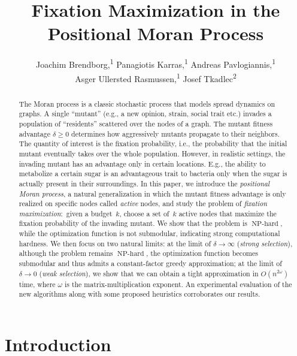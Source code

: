 \documentclass[letterpaper]{article}
\title{Fixation Maximization in the Positional Moran Process}
\author{
Joachim Brendborg,\textsuperscript{\rm 1}
Panagiotis Karras,\textsuperscript{\rm 1}
Andreas Pavlogiannis,\textsuperscript{\rm 1}\\
Asger Ullersted Rasmussen,\textsuperscript{\rm 1}
Josef Tkadlec\textsuperscript{\rm 2}
}
\def\mypath{}
\newcommand{\FitAdv}{\delta}
\newcommand{\NPH}{\operatorname{NP-hard}}
\begin{document}
\maketitle

%
\begin{abstract}
The Moran process is a classic stochastic process that models spread dynamics on graphs.
A single ``mutant'' (e.g., a new opinion, strain, social trait etc.) invades a population of ``residents'' scattered over the nodes of a graph.
The mutant fitness advantage $\FitAdv\geq 0$ determines how aggressively mutants propagate to their neighbors.
The quantity of interest is the fixation probability, i.e., the probability that the initial mutant eventually takes over the whole population.
However, in realistic settings, the invading mutant has an advantage only in certain locations.
E.g., the ability to metabolize a certain sugar is an advantageous trait to bacteria only when the sugar is actually present in their surroundings.
In this paper, we introduce the \emph{positional Moran process}, a natural generalization in which the mutant fitness advantage is only realized on specific nodes called \emph{active} nodes, and study the problem of \emph{fixation maximization}:~given a budget~$k$, choose a set of~$k$ active nodes that maximize the fixation probability of the invading mutant.
We show that the problem is $\NPH$, while the optimization function is not submodular, indicating strong computational hardness. 
We then focus on two natural limits:
at the limit of $\FitAdv\to\infty$ (\emph{strong selection}), although the problem remains $\NPH$, the optimization function becomes submodular and thus admits a constant-factor greedy approximation; at the limit of~$\FitAdv\to 0$ (\emph{weak selection}), we show that we can obtain a tight approximation in 
$O(n^{2\omega})$ time, where
$\omega$ is the matrix-multiplication exponent. An experimental evaluation of the new algorithms along with some proposed heuristics corroborates our results.
\end{abstract}


%
\section{Introduction}
\end{document}
